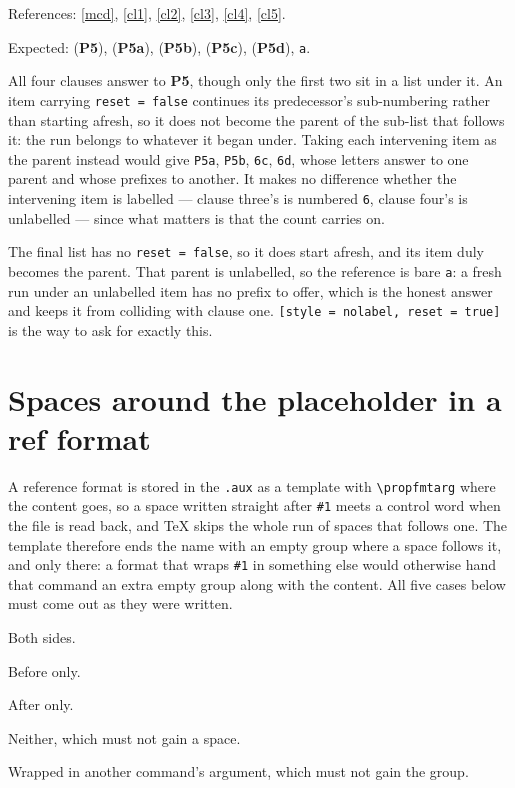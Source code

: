 \documentclass{article}
\begin{document}
References: \ref{mcd}, \ref{cl1}, \ref{cl2}, \ref{cl3}, \ref{cl4}, \ref{cl5}.

Expected: (\textbf{P5}), (\textbf{P5a}), (\textbf{P5b}), (\textbf{P5c}),
(\textbf{P5d}), \texttt{a}.

All four clauses answer to \textbf{P5}, though only the first two sit in a
list under it.  An item carrying \texttt{reset = false} continues its
predecessor's sub-numbering rather than starting afresh, so it does not become
the parent of the sub-list that follows it: the run belongs to whatever it
began under.  Taking each intervening item as the parent instead would give
\texttt{P5a}, \texttt{P5b}, \texttt{6c}, \texttt{6d}, whose letters answer
to one parent and whose prefixes to another.  It makes no difference whether
the intervening item is labelled --- clause three's is numbered \texttt{6},
clause four's is unlabelled --- since what matters is that the count carries
on.

The final list has no \texttt{reset = false}, so it does start afresh, and its
item duly becomes the parent.  That parent is unlabelled, so the reference is
bare \texttt{a}: a fresh run under an unlabelled item has no prefix to offer,
which is the honest answer and keeps it from colliding with clause one.
\texttt{[style = nolabel, reset = true]} is the way to ask for exactly this.

\section{Spaces around the placeholder in a ref format}

A reference format is stored in the \texttt{.aux} as a template with
\verb|\propfmtarg| where the content goes, so a space written straight after
\verb|#1| meets a control word when the file is read back, and TeX skips the
whole run of spaces that follows one.  The template therefore ends the name
with an empty group where a space follows it, and only there: a format that
wraps \verb|#1| in something else would otherwise hand that command an extra
empty group along with the content.  All five cases below must come out as they
were written.

\DeclareRobustCommand\double[1]{\the\numexpr#1*2\relax}

\begin{prop}[counter=enumprop]
  \item[ref format = alpha beta #1 gamma delta] Both sides. \label{sp:both}
  \item[ref format = alpha #1] Before only. \label{sp:before}
  \item[ref format = #1 omega] After only. \label{sp:after}
  \item[ref format = pre#1post] Neither, which must not gain a space.
    \label{sp:none}
  \item[ref format = {item #1, doubled \double{#1}}] Wrapped in another
    command's argument, which must not gain the group. \label{sp:wrapped}
\end{prop}
\end{document}
